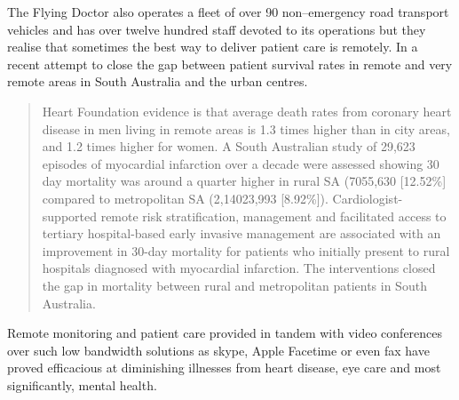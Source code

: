 The Flying Doctor also operates a fleet of over 90 non--emergency road transport vehicles and has over twelve hundred staff devoted to its operations but they realise that sometimes the best way to deliver patient care is remotely. In a recent attempt to close the gap between patient survival rates in remote and very remote areas in South Australia and the urban centres.

\begin{quotation}
Heart Foundation evidence is that average death rates from coronary heart disease in men living in remote areas is 1.3 times higher than in city areas, and 1.2 times higher for women. A South Australian study of 29,623 episodes of myocardial infarction over a decade were assessed showing 30 day mortality was around a quarter higher in rural SA (705\/5,630 [12.52\%] compared to metropolitan SA (2,140\/23,993 [8.92\%]). Cardiologist-supported remote risk stratification, management and facilitated access to tertiary hospital-based early invasive management are associated with an improvement in 30-day mortality for patients who initially present to rural hospitals diagnosed with myocardial infarction. The interventions closed the gap in mortality between rural and metropolitan patients in South Australia.
\end{quotation}

Remote monitoring and patient care provided in tandem with video conferences over such low bandwidth solutions as skype, Apple Facetime or even fax
have proved efficacious at diminishing illnesses from heart disease, eye care and most significantly, mental health.



